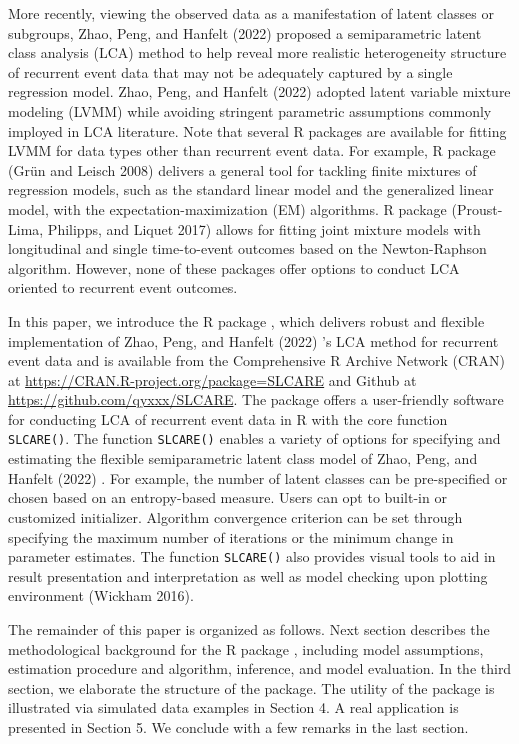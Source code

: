 More recently, viewing the observed data as a manifestation of latent classes or subgroups, Zhao, Peng, and Hanfelt (2022) proposed a semiparametric latent class analysis (LCA) method to help reveal more realistic heterogeneity structure of recurrent event data that may not be adequately captured by a single regression model.
Zhao, Peng, and Hanfelt (2022) adopted latent variable mixture modeling (LVMM) while avoiding stringent parametric assumptions commonly imployed in LCA literature. Note that several R packages are available for fitting LVMM for data types other than recurrent event data. For example, R package  (Grün and Leisch 2008) delivers a general tool for tackling finite mixtures of regression models, such as the standard linear model and the generalized linear model, with the expectation-maximization (EM) algorithms. R package  (Proust-Lima, Philipps, and Liquet 2017) allows for fitting joint mixture models with longitudinal and single time-to-event outcomes based on the Newton-Raphson algorithm. However, none of these packages offer options to conduct LCA oriented to recurrent event outcomes.

In this paper, we introduce the R package , which delivers robust and flexible implementation of Zhao, Peng, and Hanfelt (2022) 's LCA method for recurrent event data and is available from the Comprehensive R Archive Network (CRAN) at
\url{https://CRAN.R-project.org/package=SLCARE} and Github at
\url{https://github.com/qyxxx/SLCARE}. The package 
offers a user-friendly software for conducting LCA of recurrent event data in R with the core function \texttt{SLCARE()}. The function \texttt{SLCARE()} enables a variety of
options for specifying and estimating the flexible semiparametric latent class model of Zhao, Peng, and Hanfelt (2022) . For example, the number of latent classes can be pre-specified or chosen based on an entropy-based measure. Users can opt to built-in or customized initializer. Algorithm convergence criterion can be set through specifying the maximum number of iterations or the minimum change in parameter estimates. The function \texttt{SLCARE()} also provides visual tools to aid in result presentation and interpretation as well as model checking upon  plotting environment (Wickham 2016).

The remainder of this paper is organized as follows. Next section describes the methodological background for the R package , including model assumptions, estimation procedure and algorithm, inference, and model evaluation. In the third section, we elaborate the structure of the package. The utility of the package is illustrated via simulated data examples in Section 4. A real application is presented in Section 5. We conclude with a few remarks in the last section.

